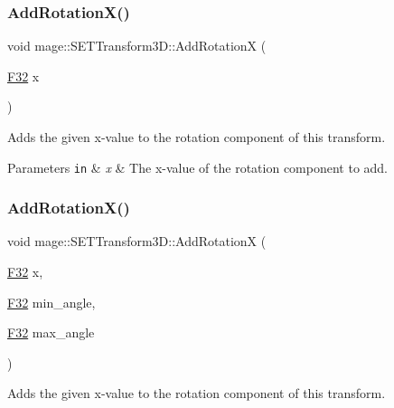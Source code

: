 \subsubsection{\texorpdfstring{Add\+Rotation\+X()}{AddRotationX()}\hspace{0.1cm}{\footnotesize\ttfamily [1/2]}}
{\footnotesize\ttfamily void mage\+::\+S\+E\+T\+Transform3\+D\+::\+Add\+RotationX (\begin{DoxyParamCaption}\item[{\mbox{\hyperlink{namespacemage_aa97e833b45f06d60a0a9c4fc22ae02c0}{F32}}}]{x }\end{DoxyParamCaption})\hspace{0.3cm}{\ttfamily [noexcept]}}

Adds the given x-\/value to the rotation component of this transform.


\begin{DoxyParams}[1]{Parameters}
\mbox{\tt in}  & {\em x} & The x-\/value of the rotation component to add. \\
\hline
\end{DoxyParams}
\mbox{\label{classmage_1_1_s_e_t_transform3_d_a87199f5c1a5b2ba9836bd6e7d932fb75}} 
\subsubsection{\texorpdfstring{Add\+Rotation\+X()}{AddRotationX()}\hspace{0.1cm}{\footnotesize\ttfamily [2/2]}}
{\footnotesize\ttfamily void mage\+::\+S\+E\+T\+Transform3\+D\+::\+Add\+RotationX (\begin{DoxyParamCaption}\item[{\mbox{\hyperlink{namespacemage_aa97e833b45f06d60a0a9c4fc22ae02c0}{F32}}}]{x,  }\item[{\mbox{\hyperlink{namespacemage_aa97e833b45f06d60a0a9c4fc22ae02c0}{F32}}}]{min\+\_\+angle,  }\item[{\mbox{\hyperlink{namespacemage_aa97e833b45f06d60a0a9c4fc22ae02c0}{F32}}}]{max\+\_\+angle }\end{DoxyParamCaption})\hspace{0.3cm}{\ttfamily [noexcept]}}

Adds the given x-\/value to the rotation component of this transform.

